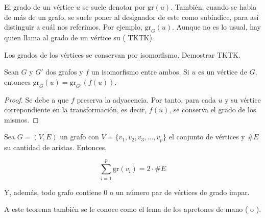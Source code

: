 El grado de un vértice $u$ se suele denotar por $\text{gr}(u)$. También,
cuando se habla de más de un grafo, se suele poner al designador de este
como subíndice, para así distinguir a cuál nos referimos. Por ejemplo,
$\text{gr}_G(u)$. Aunque no es lo usual, hay quien llama al grado de un
vértice su  ( TKTK).

Los grados de los vértices se conservan por isomorfismo. Demostrar TKTK.

\begin{proposition}
  Sean $G$ y $G'$ dos grafos y $f$ un isomorfismo entre ambos. Si $u$ es un
  vértice de $G$, entonces $\text{gr}_G(u) = \text{gr}_{G'}(f(u))$.
\end{proposition}

\begin{proof}
  Se debe a que $f$ preserva la adyacencia. Por tanto, para cada $u$ y su
  vértice correpondiente en la transformación, es decir, $f(u)$, se conserva
  el grado de los mismos.
\end{proof}

\begin{theorem}
  Sea $G = (V, E)$ un grafo con $V = \{v_1, v_2, v_3, \ldots, v_p\}$ el
  conjunto de vértices y $\#E$ su cantidad de aristas. Entonces,

  $$ \sum_{i=1}^p \text{gr}(v_i) = 2 \cdot \#E $$

  \noindent Y, además, todo grafo contiene 0 o un número par de vértices de
  grado impar.
\end{theorem}

A este teorema también se le conoce como el lema de los apretones de mano
( o ).

